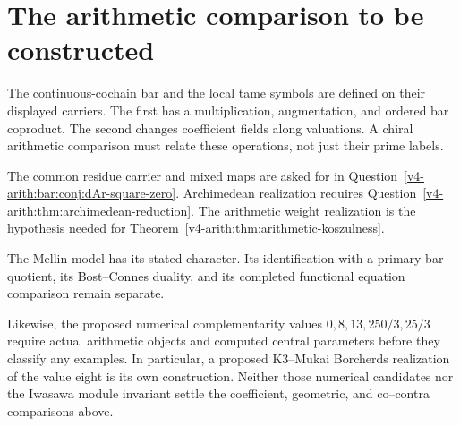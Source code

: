 \section{The arithmetic comparison to be constructed}
\label{v4-arith:bar:summary}

The continuous-cochain bar and the local tame symbols are defined on
their displayed carriers. The first has a multiplication, augmentation,
and ordered bar coproduct. The second changes coefficient fields
along valuations. A chiral arithmetic comparison must relate these
operations, not just their prime labels.

The common residue carrier and mixed maps are asked for in
Question~\ref{v4-arith:bar:conj:dAr-square-zero}. Archimedean realization
requires Question~\ref{v4-arith:thm:archimedean-reduction}. The arithmetic
weight realization is the hypothesis needed for
Theorem~\ref{v4-arith:thm:arithmetic-koszulness}.

The Mellin model has its stated character. Its identification with a
primary bar quotient, its Bost--Connes duality, and its completed
functional equation comparison remain separate.

Likewise, the proposed numerical complementarity values
\(0,8,13,250/3,25/3\) require actual arithmetic objects and computed
central parameters before they classify any examples. In particular,
a proposed K3--Mukai Borcherds realization of the value eight is its
own construction. Neither those numerical candidates nor the
Iwasawa module invariant settle the coefficient, geometric, and
co--contra comparisons above.

